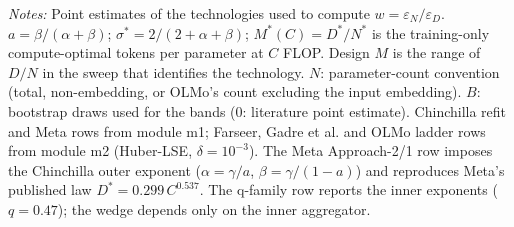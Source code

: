 \begin{table}[htbp]
\begin{threeparttable}
\begin{tablenotes}
\item \textit{Notes:} Point estimates of the technologies used to compute $w=\varepsilon_N/\varepsilon_D$. $a=\beta/(\alpha+\beta)$; $\sigma^*=2/(2+\alpha+\beta)$; $M^*(C)=D^*/N^*$ is the training-only compute-optimal tokens per parameter at $C$ FLOP. Design $M$ is the range of $D/N$ in the sweep that identifies the technology. $N$: parameter-count convention (total, non-embedding, or OLMo's count excluding the input embedding). $B$: bootstrap draws used for the bands (0: literature point estimate). Chinchilla refit and Meta rows from module m1; Farseer, Gadre et al. and OLMo ladder rows from module m2 (Huber-LSE, $\delta=10^{-3}$). The Meta Approach-2/1 row imposes the Chinchilla outer exponent ($\alpha=\gamma/a$, $\beta=\gamma/(1-a)$) and reproduces Meta's published law $D^*=0.299\,C^{0.537}$. The q-family row reports the inner exponents ($q=0.47$); the wedge depends only on the inner aggregator.
\end{tablenotes}
\end{threeparttable}
\end{table}
